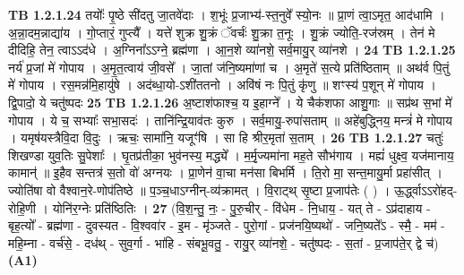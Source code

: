 \documentclass[17pt]{extarticle}
\begin{document}
                  \newline
                                \textbf{ TB 1.2.1.24} \newline
                  तयोः᳚ पृ॒ष्ठे सी॑दतु जा॒तवे॑दाः । श॒भूंः प्र॒जाभ्य॑-स्त॒नुवे᳚ स्यो॒नः ॥ प्रा॒णं त्वा॒ऽमृत॒ आद॑धामि । अ॒न्ना॒दम॒न्नाद्या॑य । गो॒प्तारं॒ गुप्त्यै᳚ । यत्ते॑ शुक्र शु॒क्रं ॅवर्चः॑ शु॒क्रा त॒नूः । शु॒क्रं ज्योति॒-रज॑स्रम् । तेन॑ मे दीदिहि॒ तेन॒ त्वाऽऽद॑धे । अ॒ग्निना᳚ऽऽग्ने॒ ब्रह्म॑णा । आ॒न॒शे व्या॑नशे॒ सर्व॒मायु॒र् व्या॑नशे । \textbf{ 24} \newline
                  \newline
                                \textbf{ TB 1.2.1.25} \newline
                  नर्य॑ प्र॒जां मे॑ गोपाय । अ॒मृ॒त॒त्वाय॑ जी॒वसे᳚ । जा॒तां ज॑नि॒ष्यमा॑णां च । अ॒मृते॑ स॒त्ये प्रति॑ष्ठिताम् ॥ अथ॑र्व पि॒तुं मे॑ गोपाय । रस॒मन्न॑मि॒हायु॑षे । अद॑ब्धा॒यो-ऽशी॑ततनो । अवि॑षं नः पि॒तुं कृ॑णु ॥ शꣳस्य॑ प॒शून् मे॑ गोपाय । द्वि॒पादो॒ ये चतु॑ष्पदः \textbf{ 25} \newline
                  \newline
                                \textbf{ TB 1.2.1.26} \newline
                  अ॒ष्टाश॑फाश्च॒ य इ॒हाग्ने᳚ । ये चैक॑शफा आशु॒गाः ॥ सप्र॑थ स॒भां मे॑ गोपाय । ये च॒ सभ्याः᳚ सभा॒सदः॑ । तानि॑न्द्रि॒याव॑तः कुरु । सर्व॒मायु॒-रुपा॑सताम् ॥ अहे॑बुद्ध्निय॒ मन्त्रं॑ मे गोपाय । यमृष॑यस्त्रैवि॒दा वि॒दुः । ऋचः॒ सामा॑नि॒ यजूꣳ॑षि । सा हि श्रीर॒मृता॑ स॒ताम् । \textbf{ 26} \newline
                  \newline
                                \textbf{ TB 1.2.1.27} \newline
                  चतुः॑ शिखण्डा युव॒तिः सु॒पेशाः᳚ । घृ॒तप्र॑तीका॒ भुव॑नस्य॒ मद्ध्ये᳚ । म॒र्मृ॒ज्यमा॑ना मह॒ते सौभ॑गाय । मह्यं॑ धुक्ष्व॒ यज॑मानाय॒ कामान्॑ ॥ इ॒हैव सन्तत्र॑ स॒तो वो॑ अग्नयः । प्रा॒णेन॑ वा॒चा मन॑सा बिभर्मि । ति॒रो मा॒ सन्त॒मायु॒र्मा प्रहा॑सीत् । ज्योति॑षा वो वैश्वान॒रे-णोप॑तिष्ठे ॥ प॒ञ्च॒धाऽग्नीन्-व्य॑क्रामत् । वि॒राट्थ् सृ॒ष्टा प्र॒जाप॑तेः ( ) । ऊ॒र्द्ध्वाऽऽरो॑हद्-रोहि॒णी । योनि॑र॒ग्नेः प्रति॑ष्ठितिः । \textbf{ 27} \newline
                  \newline
                                    (वि॒श॒न्तु॒ नः॒ - पु॒रु॒चीर् - वि॑धेम - नि॒धाय॒ - यत् ते - ऽप्र॑दाहाय - बृह॒त्यो᳚ - ब्रह्म॑णा - दुवस्यत - वि॒श्ववा॑र - इ॒म - मृ॑ञ्जते - पुरो॒गां - प्रज॑नयि॒ष्यथो॑ - जनि॒ष्यते᳚ऽ - स्मै॒ - मम॑ - महि॒म्ना - वर्च॑से॒ - दध॑थ् - सुव॒र्गा - भा॑हि - संबभू॒वतु॒ - रायु॒र् व्या॑नशे॒ - चतु॑ष्पदः - स॒तां - प्र॒जाप॑ते॒र् द्वे च॑) \textbf{(A1)} \newline \newline
\end{document}
